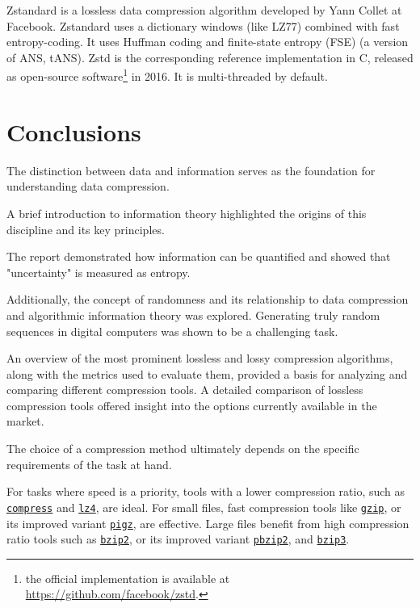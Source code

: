 \documentclass[12pt, a4paper]{report}
\begin{document}
Zstandard is a lossless data compression algorithm developed by Yann Collet at Facebook.
Zstandard uses a dictionary windows (like LZ77) combined with fast entropy-coding.
It uses Huffman coding and finite-state entropy (FSE) (a version of ANS, tANS).
Zstd is the corresponding reference implementation in C, released as open-source software\footnote{the official implementation is
available at \url{https://github.com/facebook/zstd}.} in 2016.
It is multi-threaded by default.

\appendix

\chapter{Conclusions}

The distinction between data and information serves as the foundation for understanding data compression.

A brief introduction to information theory highlighted the origins of this discipline and its key principles.

The report demonstrated how information can be quantified and showed that "uncertainty" is measured as entropy.

Additionally, the concept of randomness and its relationship to data compression and algorithmic information theory was explored.
Generating truly random sequences in digital computers was shown to be a challenging task.

An overview of the most prominent lossless and lossy compression algorithms, along with the metrics used to evaluate them,
provided a basis for analyzing and comparing different compression tools.
A detailed comparison of lossless compression tools offered insight into the options currently available in the market.

The choice of a compression method ultimately depends on the specific requirements of the task at hand.

For tasks where speed is a priority, tools with a lower compression ratio, such as \hyperref[subsec:compress]{\texttt{compress}}
and \hyperref[subsec:lz4]{\texttt{lz4}}, are ideal.
For small files, fast compression tools like \hyperref[subsec:gzip]{\texttt{gzip}}, or its improved variant
\hyperref[subsec:gzip]{\texttt{pigz}}, are effective.
Large files benefit from high compression ratio tools such as \hyperref[subsec:bzip2]{\texttt{bzip2}}, or its improved variant
\hyperref[subsec:bzip2]{\texttt{pbzip2}}, and \hyperref[subsec:bzip3]{\texttt{bzip3}}.
\end{document}
